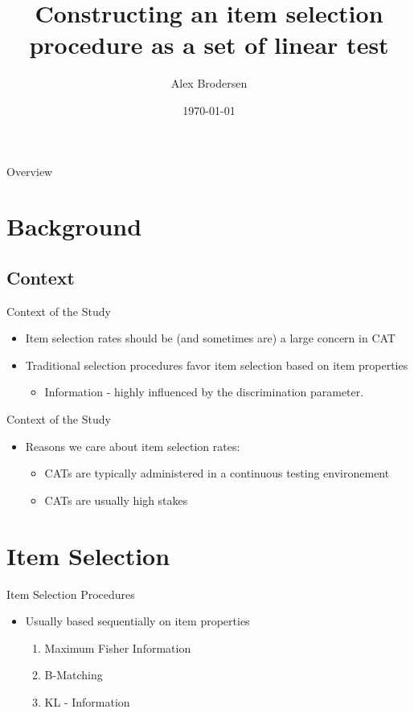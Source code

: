 \documentclass{beamer}
\title[Post. Dist. Exp.]{Constructing an item selection procedure as a set of linear test}
\author[Brodersen]{Alex Brodersen}
\institute[Notre Dame]{
  \\ A project presentation for the irtND (PEM) lab 
}
\date{\today}
\begin{document}
\maketitle

\begin{frame}{Overview}
\tableofcontents
\end{frame}

\section{Background}
\subsection{Context}
\begin{frame}{Context of the Study}
  \begin{itemize}
  \item Item selection rates should be (and sometimes are) a large concern in CAT
    \hfill \break
  \item Traditional selection procedures favor item selection based on item properties
    \begin{itemize}
    \item Information - highly influenced by the discrimination parameter.
    \end{itemize}
  \end{itemize}
\end{frame}

\addtocounter{framenumber}{-1}

\begin{frame}{Context of the Study}
  \begin{itemize}
  \item Reasons we care about item selection rates:
    \begin{itemize}
    \item CATs are typically administered in a continuous testing environement
    \item CATs are usually high stakes
    \end{itemize}
  \end{itemize}
\end{frame}


\section{Item Selection}
\begin{frame}{Item Selection Procedures}
\begin{itemize}
\item Usually based sequentially on item properties
  \begin{enumerate}[1)]
    \item Maximum Fisher Information
    \item B-Matching
    \item KL - Information
  \end{enumerate}
\end{itemize}
\end{frame}
\end{document}
